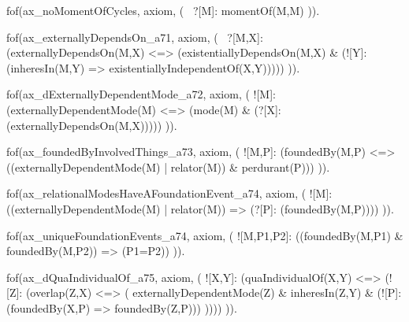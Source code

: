 fof(ax_noMomentOfCycles, axiom, (
  ~?[M]: momentOf(M,M)
)).










fof(ax_externallyDependsOn_a71, axiom, (
  ~?[M,X]: (externallyDependsOn(M,X) <=> (existentiallyDependsOn(M,X) & (![Y]: (inheresIn(M,Y) => existentiallyIndependentOf(X,Y)))))
)).

fof(ax_dExternallyDependentMode_a72, axiom, (
  ![M]: (externallyDependentMode(M) <=> (mode(M) & (?[X]: (externallyDependsOn(M,X)))))
)).


fof(ax_foundedByInvolvedThings_a73, axiom, (
  ![M,P]: (foundedBy(M,P) <=> ((externallyDependentMode(M) | relator(M)) & perdurant(P)))
)).

fof(ax_relationalModesHaveAFoundationEvent_a74, axiom, (
  ![M]: ((externallyDependentMode(M) | relator(M)) => (?[P]: (foundedBy(M,P))))
)).

fof(ax_uniqueFoundationEvents_a74, axiom, (
  ![M,P1,P2]: ((foundedBy(M,P1) & foundedBy(M,P2)) => (P1=P2))
)).



fof(ax_dQuaIndividualOf_a75, axiom, (
  ![X,Y]: (quaIndividualOf(X,Y) <=> (![Z]: (overlap(Z,X) <=> (
    externallyDependentMode(Z) & inheresIn(Z,Y) & (![P]: (foundedBy(X,P) => foundedBy(Z,P)))
  ))))
)).


